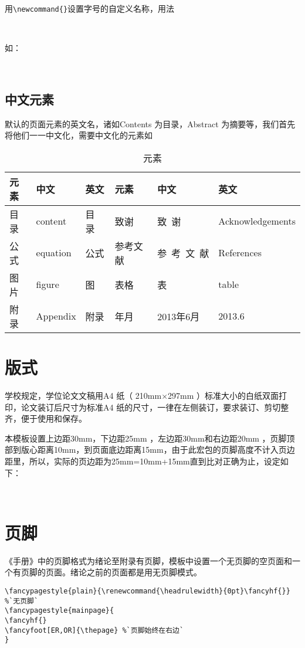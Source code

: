 用\verb|\newcommand{}|设置字号的自定义名称，用法

{\centering {\verb|\newcommand{命令}{\fontsize{大小}{行距}\selectfont}|}\\}

如：

{\centering {\verb|\newcommand{erhao}{\fontsize{22pt}{\baselineskip}\selectfont}|}\\}

\subsection{中文元素}
默认的页面元素的英文名，诸如Contents 为目录，Abstract 为摘要等，我们首先将他们一一中文化，需要中文化的元素如
\begin{table}[htbp]
\begin{center}
\caption{元素}
\label{tab:element}
\begin{tabularx}{\linewidth}{ZZZZZZ}\toprule
元素 & 中文 & 英文 & 元素 & 中文 & 英文 \\\midrule
目录 & content & 目 录 & 致谢 & 致~谢 & Acknowledgements \\
公式 & equation & 公式 & 参考文献 & 参~考~文~献 & References \\
图片 & figure & 图 & 表格 & 表 & table\\
附录 & Appendix & 附录 & 年月 & 2013年6月 & 2013.6 \\\bottomrule
\end{tabularx}
\end{center}
\end{table}

\section{版式}
学校规定，学位论文文稿用A4 纸（ 210mm×297mm ）标准大小的白纸双面打印，论文装订后尺寸为标准A4 纸的尺寸，一律在左侧装订，要求装订、剪切整齐，便于使用和保存。

本模板设置上边距30mm，下边距25mm ，左边距30mm和右边距20mm ，页脚顶部到版心距离10mm，到页面底边距离15mm，由于此宏包的页脚高度不计入页边距里，所以，实际的页边距为25mm=10mm+15mm直到比对正确为止，设定如下：

{\\}

\section{页脚}
《手册》中的页脚格式为绪论至附录有页脚，模板中设置一个无页脚的空页面和一个有页脚的页面。绪论之前的页面都是用无页脚模式。
\begin{lstlisting}
\fancypagestyle{plain}{\renewcommand{\headrulewidth}{0pt}\fancyhf{}} %`无页脚`
\fancypagestyle{mainpage}{
\fancyhf{}
\fancyfoot[ER,OR]{\thepage} %`页脚始终在右边`
} 
\end{lstlisting}

